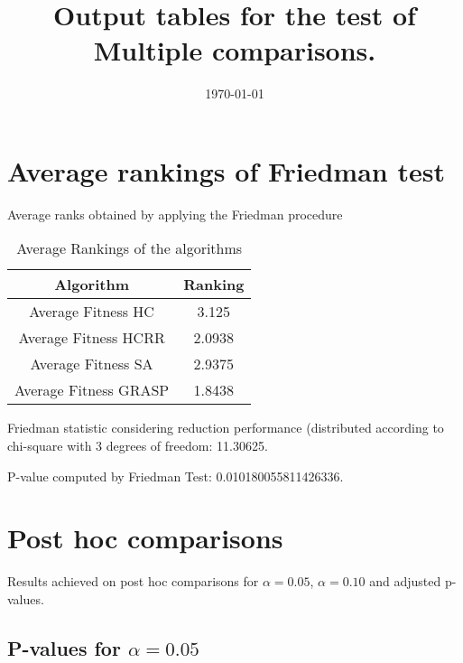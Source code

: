 \documentclass[a4paper,10pt]{article}
\title{Output tables for the test of Multiple comparisons.}
\author{}
\date{\today}
\begin{document}
\begin{landscape}
\pagestyle{empty}
\maketitle
\thispagestyle{empty}
\section{Average rankings of Friedman test}



Average ranks obtained by applying the Friedman procedure

\begin{table}[!htp]
\centering
\begin{tabular}{|c|c|}\hline
Algorithm&Ranking\\\hline
Average Fitness HC       & 3.125\\
Average Fitness HCRR    & 2.0938\\
Average Fitness SA      & 2.9375\\
Average Fitness GRASP & 1.8438\\
\hline
\end{tabular}
\caption{Average Rankings of the algorithms}
\end{table}

Friedman statistic considering reduction performance (distributed according to chi-square with 3 degrees of freedom: 11.30625.

P-value computed by Friedman Test: 0.010180055811426336.\newline



\pagebreak

\section{Post hoc comparisons}

Results achieved on post hoc comparisons for $\alpha = 0.05$, $\alpha = 0.10$ and adjusted p-values.

\subsection{P-values for $\alpha=0.05$}


\end{landscape}
\end{document}
